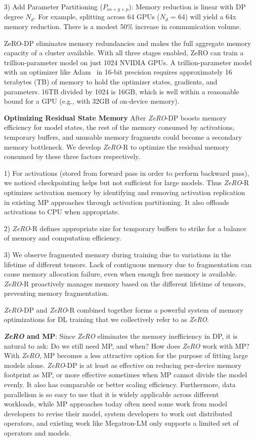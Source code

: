 \documentclass{article}
\newcommand{\name}{\emph{ZeRO}\xspace}
\begin{document}
3) Add Parameter Partitioning ($P_{os+g+p}$): Memory reduction is linear with DP degree $N_d$. For example, splitting across 64 GPUs ($N_d$ = 64) will yield a 64x memory reduction. There is a modest 50\% increase in communication volume.

ZeRO-DP eliminates memory redundancies and makes the full aggregate memory capacity of a cluster available. With all three stages enabled, ZeRO can train a trillion-parameter model on just 1024 NVIDIA GPUs. A trillion-parameter model with an optimizer like Adam~\cite{DBLP:journals/corr/Adam} in 16-bit precision requires approximately 16 terabytes (TB) of memory to hold the optimizer states, gradients, and parameters. 16TB divided by 1024 is 16GB, which is well within a reasonable bound for a GPU (e.g., with 32GB of on-device memory).

{\bf Optimizing Residual State Memory}
After \name-DP boosts memory efficiency for model states, the rest of the memory consumed by activations, temporary buffers, and unusable memory fragments could become a secondary memory bottleneck.  We develop \name-R to optimize the residual memory consumed by these three factors respectively.  

1) For activations (stored from forward pass in order to perform backward pass), we noticed checkpointing \cite{DBLP:journals/corr/ChenXZG16} helps but not sufficient for large models.  
Thus \name-R optimizes activation memory by identifying and removing activation replication in existing MP approaches through activation partitioning. It also offloads activations to CPU when appropriate.

2) \name-R defines appropriate size for temporary buffers to strike for a balance of memory and computation efficiency. 

3) We observe fragmented memory during training due to variations in the lifetime of different tensors. Lack of contiguous memory due to fragmentation can cause memory allocation failure, even when enough free memory is available. \name-R proactively manages memory based on the different lifetime of tensors, preventing memory fragmentation.

\name-DP and \name-R combined together forms a powerful system of memory optimizations for DL training that we collectively refer to as \name.

\textbf{\name and MP}: Since \name eliminates the memory inefficiency in DP, it is natural to ask: Do we still need MP, and when?  How does \name work with MP?  With \name, MP becomes a less attractive option for the purpose of fitting large models alone.  \name-DP is at least as effective on reducing per-device memory footprint as MP, or more effective sometimes when MP cannot divide the model evenly. It also has comparable or better scaling efficiency. Furthermore, data parallelism is so easy to use that it is widely applicable across different workloads, while MP approaches today often need some work from model developers to revise their model, system developers to work out distributed operators, and existing work like Megatron-LM only supports a limited set of operators and models.
\end{document}
